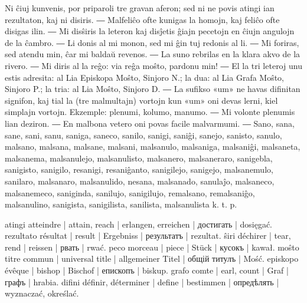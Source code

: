 Ni ĉiuj kunvenis, por priparoli tre gravan aferon; sed ni ne povis atingi ian rezultaton, kaj ni disiris. ― Malfeliĉo ofte kunigas la homojn, kaj feliĉo ofte disigas ilin. ― Mi disŝiris la leteron kaj disĵetis ĝiajn pecetojn en ĉiujn angulojn de la ĉambro. ― Li donis al mi monon, sed mi ĝin tuj redonis al li. ― Mi foriras, sed atendu min, ĉar mi baldaŭ revenos. ― La suno rebrilas en la klara akvo de la rivero. ― Mi diris al la reĝo: via reĝa moŝto, pardonu min! ― El la tri leteroj unu estis adresita: al Lia Episkopa Moŝto, Sinjoro N.; la dua: al Lia Grafa Moŝto, Sinjoro P.; la tria: al Lia Moŝto, Sinjoro D. ― La sufikso «um» ne havas difinitan signifon, kaj tial la (tre malmultajn) vortojn kun «um» oni devas lerni, kiel simplajn vortojn. Ekzemple: plenumi, kolumo, manumo. ― Mi volonte plenumis lian deziron. ― En malbona vetero oni povas facile malvarmumi. ― Sano, sana, sane, sani, sanu, saniga, saneco, sanilo, sanigi, saniĝi, sanejo, sanisto, sanulo, malsano, malsana, malsane, malsani, malsanulo, malsaniga, malsaniĝi, malsaneta, malsanema, malsanulejo, malsanulisto, malsanero, malsaneraro, sanigebla, sanigisto, sanigilo, resanigi, resaniĝanto, sanigilejo, sanigejo, malsanemulo, sanilaro, malsanaro, malsanulido, nesana, malsanado, sanulaĵo, malsaneco, malsanemeco, saniginda, sanilujo, sanigilujo, remalsano, remalsaniĝo, malsanulino, sanigista, sanigilista, sanilista, malsanulista k. t. p.

atingi atteindre | attain, reach | erlangen, erreichen | достигать | dosięgać.
rezultato résultat | result | Ergebniss | результатъ | rezultat.
ŝiri déchirer | tear, rend | reissen | рвать | rwać.
peco morceau | piece | Stück | кусокъ | kawał.
moŝto titre commun | universal title | allgemeiner Titel | общій титулъ | Mość.
episkopo évêque | bishop | Bischof | епископъ | biskup.
grafo comte | earl, count | Graf | графъ | hrabia.
difini définir, déterminer | define | bestimmen | опредѣлять | wyznaczać, określać.

\cleardoublepage
